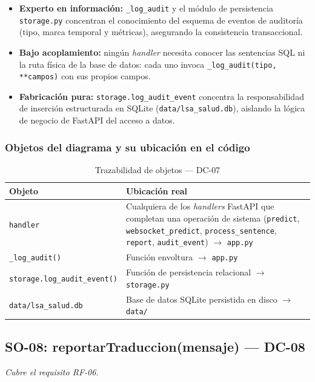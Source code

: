 \begin{itemize}[leftmargin=*, itemsep=2pt]
    \item \textbf{Experto en información:} \texttt{\_log\_audit} y el
    módulo de persistencia \texttt{storage.py} concentran el conocimiento
    del esquema de eventos de auditoría (tipo, marca temporal y métricas),
    asegurando la consistencia transaccional.
    \item \textbf{Bajo acoplamiento:} ningún \textit{handler} necesita
    conocer las sentencias SQL ni la ruta física de la base de datos: cada
    uno invoca \texttt{\_log\_audit(tipo, **campos)} con sus propios campos.
    \item \textbf{Fabricación pura:} \texttt{storage.log\_audit\_event}
    concentra la responsabilidad de inserción estructurada en SQLite
    (\texttt{data/lsa\_salud.db}), aislando la lógica de negocio de FastAPI
    del acceso a datos.
\end{itemize}

\subsubsection{Objetos del diagrama y su ubicación en el código}

\begin{table}[H]
\centering
\begin{tabularx}{\textwidth}{@{}l X@{}}
\toprule
\textbf{Objeto} & \textbf{Ubicación real} \\
\midrule
\texttt{handler} & Cualquiera de los \textit{handlers} FastAPI que completan una operación de sistema (\texttt{predict}, \texttt{websocket\_predict}, \texttt{process\_sentence}, \texttt{report}, \texttt{audit\_event}) $\rightarrow$ \texttt{app.py} \\
\texttt{\_log\_audit()} & Función envoltura $\rightarrow$ \texttt{app.py} \\
\texttt{storage.log\_audit\_event()} & Función de persistencia relacional $\rightarrow$ \texttt{storage.py} \\
\texttt{data/lsa\_salud.db} & Base de datos SQLite persistida en disco $\rightarrow$ \texttt{data/} \\
\bottomrule
\end{tabularx}
\caption{Trazabilidad de objetos --- DC-07}
\label{tab:col-objetos-dc07}
\end{table}

\subsection{SO-08: reportarTraduccion(mensaje) --- DC-08}
\textit{Cubre el requisito RF-06.}

